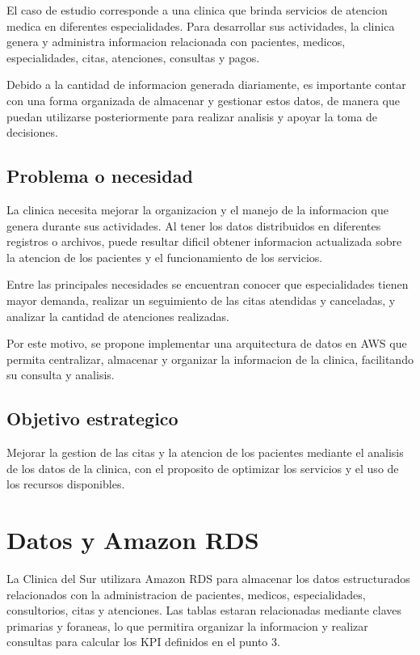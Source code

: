 \documentclass[11pt,letterpaper]{article}
\begin{document}
El caso de estudio corresponde a una clinica que brinda servicios de atencion medica en
diferentes especialidades. Para desarrollar sus actividades, la clinica genera y administra
informacion relacionada con pacientes, medicos, especialidades, citas, atenciones, consultas y
pagos.

Debido a la cantidad de informacion generada diariamente, es importante contar con una forma
organizada de almacenar y gestionar estos datos, de manera que puedan utilizarse posteriormente
para realizar analisis y apoyar la toma de decisiones.

\subsection{Problema o necesidad}

La clinica necesita mejorar la organizacion y el manejo de la informacion que genera durante sus
actividades. Al tener los datos distribuidos en diferentes registros o archivos, puede resultar
dificil obtener informacion actualizada sobre la atencion de los pacientes y el funcionamiento de
los servicios.

Entre las principales necesidades se encuentran conocer que especialidades tienen mayor demanda,
realizar un seguimiento de las citas atendidas y canceladas, y analizar la cantidad de atenciones
realizadas.

Por este motivo, se propone implementar una arquitectura de datos en AWS que permita centralizar,
almacenar y organizar la informacion de la clinica, facilitando su consulta y analisis.

\subsection{Objetivo estrategico}

Mejorar la gestion de las citas y la atencion de los pacientes mediante el analisis de los datos
de la clinica, con el proposito de optimizar los servicios y el uso de los recursos disponibles.

\section{Datos y Amazon RDS}

La Clinica del Sur utilizara Amazon RDS para almacenar los datos estructurados relacionados con la
administracion de pacientes, medicos, especialidades, consultorios, citas y atenciones. Las tablas
estaran relacionadas mediante claves primarias y foraneas, lo que permitira organizar la
informacion y realizar consultas para calcular los KPI definidos en el punto 3.
\end{document}
